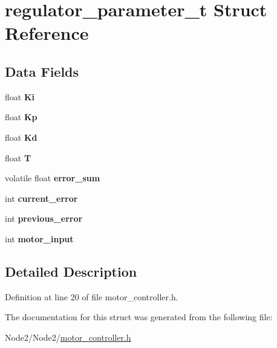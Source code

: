 \hypertarget{structregulator__parameter__t}{}\section{regulator\+\_\+parameter\+\_\+t Struct Reference}
\label{structregulator__parameter__t}
\subsection*{Data Fields}
\begin{DoxyCompactItemize}
\item 
\mbox{\label{structregulator__parameter__t_a1b3aa4e6700fda7fe40868c7cfd6db7e}} 
float {\bfseries Ki}
\item 
\mbox{\label{structregulator__parameter__t_a95cca192ee7845c825a33e4fa3972f48}} 
float {\bfseries Kp}
\item 
\mbox{\label{structregulator__parameter__t_a9bf44b8225d0ed65b51042c858eba27e}} 
float {\bfseries Kd}
\item 
\mbox{\label{structregulator__parameter__t_a826b1548a9bdfc6ca0800d7d8997b5c6}} 
float {\bfseries T}
\item 
\mbox{\label{structregulator__parameter__t_a5d1aeccf5b1661e06c6bc2ab47e2705c}} 
volatile float {\bfseries error\+\_\+sum}
\item 
\mbox{\label{structregulator__parameter__t_a9e404abd5019a3392e962ba332968646}} 
int {\bfseries current\+\_\+error}
\item 
\mbox{\label{structregulator__parameter__t_acdd857f6031698c13ee87dd1fb8d3d8a}} 
int {\bfseries previous\+\_\+error}
\item 
\mbox{\label{structregulator__parameter__t_a806e9d6b19e1f2c0fcc4ac5707fcb914}} 
int {\bfseries motor\+\_\+input}
\end{DoxyCompactItemize}


\subsection{Detailed Description}


Definition at line 20 of file motor\+\_\+controller.\+h.



The documentation for this struct was generated from the following file\+:\begin{DoxyCompactItemize}
\item 
Node2/\+Node2/\hyperlink{motor__controller_8h}{motor\+\_\+controller.\+h}\end{DoxyCompactItemize}
